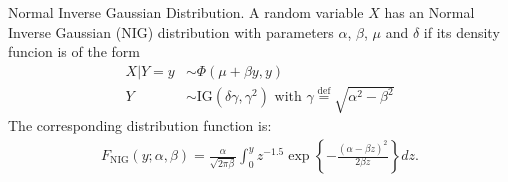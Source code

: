 \begin{definition} Normal Inverse Gaussian Distribution.
    A random variable $X$ has an Normal Inverse Gaussian (NIG) distribution with parameters $\alpha$, $\beta$, $\mu$ and $\delta$ if its density funcion is of the form
    \begin{align}
        X|Y=y &\sim \Phi(\mu + \beta y, y)\\
            Y &\sim \text{IG}(\delta \gamma, \gamma^2) \text{ with } \gamma \overset{\text{def}}{=}\sqrt{\alpha^2-\beta^2}
    \end{align}
    The corresponding distribution function is:
        \begin{align}
        F_\text{NIG}(y; \alpha, \beta) = \frac{\alpha}{\sqrt{2\pi \beta}}
        \int_0^y z^{-1.5} \exp\left\{
        -\frac{(\alpha - \beta z)^2}{2\beta z}
        \right\}
            dz.
    \end{align}
    \end{definition}






